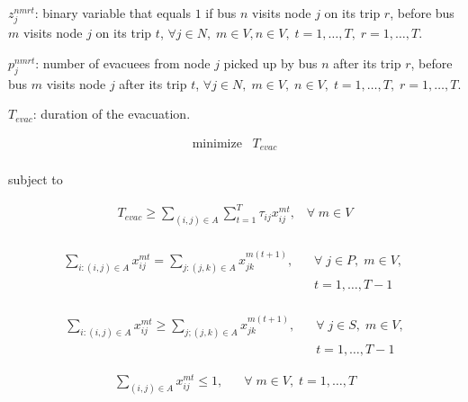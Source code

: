 \documentclass[conference]{IEEEtran}
\begin{document}
$z_{j}^{nmrt}$: binary variable that equals $1$ if bus $n$ visits node $j$ on its trip $r$, before bus $m$ visits node $j$ on its trip $t$, $\forall j \in N,\; m \in V, n \in V,\; t = 1, \dots, T,\; r = 1, \dots, T$.

$p_{j}^{nmrt}$: number of evacuees from node $j$ picked up by bus $n$ after its trip $r$, before bus $m$ visits node $j$ after its trip $t$, $\forall j \in N,\; m \in V,\; n \in V,\; t = 1, \dots, T,\; r = 1, \dots, T$.

$T_{evac}$: duration of the evacuation.



\begin{equation}
    \begin{split}
    \text{minimize} \;\;\;T_{evac}\label{eq1}\\
    \end{split}
\end{equation}

subject to

\begin{equation}
    \begin{split}
    T_{evac} \geq \sum_{(i, j)\in A}\sum_{t=1}^{T} \tau_{ij} x_{ij}^{mt}, \;\;\;\forall\; m \in V\\\label{eq2}
    \end{split}
\end{equation}


\begin{equation}
    \begin{split}
    \sum_{i:(i, j)\in A}x_{ij}^{mt} = \sum_{j:(j, k) \in A}x_{jk}^{m(t + 1)},\;\;\; & \forall \; j \in P,\; m \in V, \;\\ & t=1, \dots, T-1\\\label{eq3}
    \end{split} 
\end{equation}

\begin{equation}
    \begin{split}
        \sum_{i:(i,j) \in A}x_{ij}^{mt} \geq \sum_{j;(j, k) \in A}x_{jk}^{m(t + 1)}, \;\;\; & \forall \; j \in S,\; m \in V, \\ & t=1, \dots, T - 1\label{eq4}
    \end{split}
\end{equation}

\begin{equation}
    \begin{split}
        \sum_{(i, j) \in A}x_{ij}^{mt} \leq 1, \;\;\; & \forall \; m \in V, \; t=1, \dots, T\\\label{eq5}
    \end{split}
\end{equation}
\end{document}
